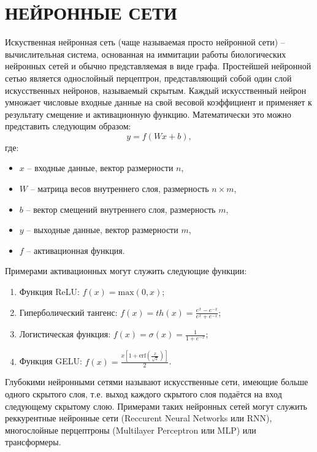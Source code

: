 \section{НЕЙРОННЫЕ СЕТИ}
Искуственная нейронная сеть (чаще называемая просто нейронной сети) -- вычислительная система, основанная на иммитации работы биологических нейронных сетей и обычно представляемая в виде графа. Простейшей нейронной сетью является однослойный перцептрон, представляющий собой один слой искусственных нейронов, называемый скрытым. Каждый искусственный нейрон умножает числовые входные данные на свой весовой коэффициент и применяет к результату смещение и активационную функцию. Математически это можно представить следующим образом:
\begin{equation}
    y = f(Wx + b),
\end{equation}  
где:
\begin{itemize}
    \item $x$ -- входные данные, вектор размерности $n$,
    \item $W$ -- матрица весов внутреннего слоя, размерность $n \times m$,
    \item $b$ -- вектор смещений внутреннего слоя, размерность $m$,
    \item $y$ -- выходные данные, вектор размерности $m$,
    \item $f$ -- активационная функция.
\end{itemize}

Примерами активационных могут служить следующие функции:
\begin{enumerate}
    \item Функция ReLU: $f(x) = \text{max}(0, x)$;
    \item Гиперболический тангенс: $f(x) = th(x) = \frac{e^x - e^{-x}}{e^x + e^{-x}}$;
    \item Логистическая функция: $f(x) = \sigma(x) = \frac{1}{1 + e^{-x}}$;
    \item Функция GELU: $f(x) = \frac{x[1 + \text{erf}(\frac{x}{\sqrt{2}})]}{2}$.
\end{enumerate}

Глубокими нейронными сетями называют искусственные сети, имеющие больше одного скрытого слоя, т.е. выход каждого скрытого слоя подаётся на вход следующему скрытому слою. Примерами таких нейронных сетей могут служить реккурентные нейронные сети (Reccurent Neural Networks или RNN), многослойные перцептроны (Multilayer Perceptron или MLP) или трансформеры.

